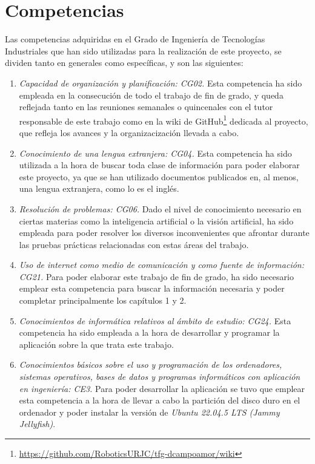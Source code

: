 \section{Competencias}
\label{sec:competencias}

Las competencias adquiridas en el Grado de Ingeniería de Tecnologías Industriales que han sido utilizadas para la realización de este proyecto, se dividen tanto en generales como específicas, y son las siguientes:

\begin{enumerate} 
  \item \textit{Capacidad de organización y planificación: CG02.} Esta competencia ha sido empleada en la consecución de todo el trabajo de fin de grado, y queda reflejada tanto en las reuniones semanales o quincenales con el tutor responsable de este trabajo como en la wiki de GitHub\footnote{\url{https://github.com/RoboticsURJC/tfg-dcampoamor/wiki}} dedicada al proyecto, que refleja los avances y la organizacización llevada a cabo.  
  \item \textit{Conocimiento de una lengua extranjera: CG04.} Esta competencia ha sido utilizada a la hora de buscar toda clase de información para poder elaborar este proyecto, ya que se han utilizado documentos publicados en, al menos, una lengua extranjera, como lo es el inglés.
  \item \textit{Resolución de problemas: CG06.} Dado el nivel de conocimiento necesario en ciertas materias como la inteligencia artificial o la visión artificial, ha sido empleada para poder resolver los diversos inconvenientes que afrontar durante las pruebas prácticas relacionadas con estas áreas del trabajo.
  \item \textit{Uso de internet como medio de comunicación y como fuente de información: CG21.} Para poder elaborar este trabajo de fin de grado, ha sido necesario emplear esta competencia para buscar la información necesaria y poder completar principalmente los capítulos 1 y 2.
  \item \textit{Conocimientos de informática relativos al ámbito de estudio: CG24.} Esta competencia ha sido empleada a la hora de desarrollar y programar la aplicación sobre la que trata este trabajo.
  \item \textit{Conocimientos básicos sobre el uso y programación de los ordenadores, sistemas operativos, bases de datos y programas informáticos con aplicación en ingeniería: CE3.} Para poder desarrollar la aplicación se tuvo que emplear esta competencia a la hora de llevar a cabo la partición del disco duro en el ordenador y poder instalar la versión de \textit{Ubuntu 22.04.5 LTS (Jammy Jellyfish)}.  

\end{enumerate}
